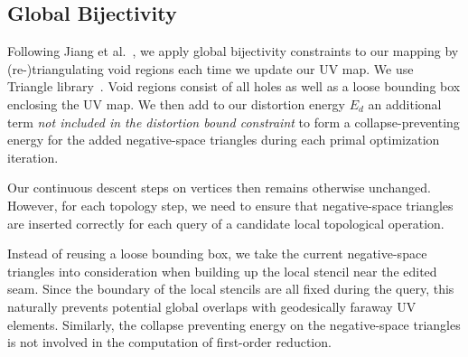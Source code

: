 %

\subsection{Global Bijectivity}
\label{sec:bijectivity}

Following Jiang et al.\ , we apply global bijectivity constraints to our mapping by (re-)triangulating void regions each time we update our UV map. We use Triangle library~\cite{shewchuk1996triangle}. Void regions consist of all holes as well as a loose bounding box enclosing the UV map.
We then add to our distortion energy $E_d$ an additional term \emph{not included in the distortion bound constraint} to form a collapse-preventing energy for the added negative-space triangles during each primal optimization iteration.

Our continuous descent steps on vertices then remains otherwise unchanged.
However, for each topology step, we need to ensure that negative-space triangles are inserted correctly for each query of a candidate local topological operation.

Instead of reusing a loose bounding box, we take the current negative-space triangles into consideration when building up the local stencil near the edited seam. Since the boundary of the local stencils are all fixed during the query, this naturally prevents potential global overlaps with geodesically faraway UV elements. Similarly, the collapse preventing energy on the negative-space triangles is not involved in the computation of first-order reduction.

